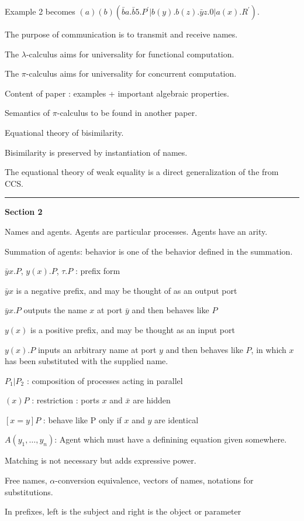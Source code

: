 \documentclass[a4paper]{article}
\begin{document}
Example 2 becomes $(a)(b)(\bar b a.\bar b 5.P^\prime|b(y).b(z).\bar y z.0|a(x).R^\prime)$.

The purpose of communication is to transmit and receive names.

The $\lambda$-calculus aims for universality for functional computation.

The $\pi$-calculus aims for universality for concurrent computation.

Content of paper : examples + important algebraic properties.

Semantics of $\pi$-calculus to be found in another paper.

Equational theory of bisimilarity.

Bisimilarity is preserved by instantiation of names.

The equational theory of weak equality is a direct generalization of the from CCS.

\hrule

\textbf{Section 2}

Names and agents.
Agents are particular processes.
Agents have an arity.

Summation of agents: behavior is one of the behavior defined in the summation.

$\bar y x.P$, $y(x).P$, $\tau.P$ : prefix form

$\bar y x$ is a negative prefix, and may be thought of as an output port

$\bar y x.P$ outputs the name $x$ at port $\bar y$ and then behaves like $P$

$y(x)$ is a positive prefix, and may be thought as an input port

$y(x).P$ inputs an arbitrary name at port $y$ and then behaves like $P$, in which $x$ has been substituted with the supplied name.

$P_1|P_2$ : composition of processes acting in parallel

$(x)P$ : restriction : ports $x$ and $\bar x$ are hidden

$[x=y]P$ : behave like P only if $x$ and $y$ are identical

$A(y_1,\dots,y_n)$: Agent which must have a definining equation given somewhere.

Matching is not necessary but adds expressive power.

Free names, $\alpha$-conversion equivalence, vectors of names, notations for substitutions.

In prefixes, left is the subject and right is the object or parameter
\end{document}
